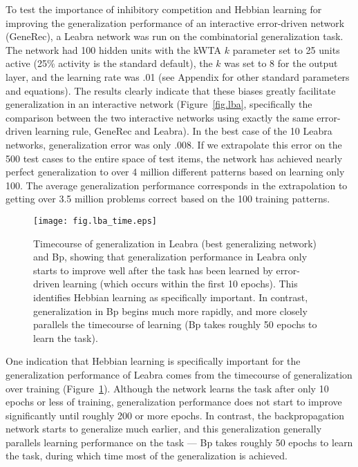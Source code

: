 \documentclass[12pt,twoside]{article}
\begin{document}
To test the importance of inhibitory competition and Hebbian learning
for improving the generalization performance of an interactive
error-driven network (GeneRec), a Leabra network was run on the
combinatorial generalization task.  The network had 100 hidden units
with the kWTA $k$ parameter set to 25 units active (25\% activity is
the standard default), the $k$ was set to 8 for the output layer, and
the learning rate was .01 (see Appendix for other standard parameters
and equations).  The results clearly indicate that these biases
greatly facilitate generalization in an interactive network
(Figure~\ref{fig.lba}, specifically the comparison between the two
interactive networks using exactly the same error-driven learning
rule, GeneRec and Leabra).  In the best case of the 10 Leabra
networks, generalization error was only .008.  If we extrapolate this
error on the 500 test cases to the entire space of test items, the
network has achieved nearly perfect generalization to over 4 million
different patterns based on learning only 100.  The average
generalization performance corresponds in the extrapolation to getting
over 3.5 million problems correct based on the 100 training patterns.

\begin{figure}
  \centering\texttt{[image: fig.lba\_time.eps]}
  \caption{\small Timecourse of generalization in Leabra (best
    generalizing network) and Bp, showing that generalization
    performance in Leabra only starts to improve well after the task
    has been learned by error-driven learning (which occurs within the
    first 10 epochs).  This identifies Hebbian learning as
    specifically important.  In contrast, generalization in Bp begins
    much more rapidly, and more closely parallels the timecourse of
    learning (Bp takes roughly 50 epochs to learn the task).}
  \label{fig.lba_time}
\end{figure}

One indication that Hebbian learning is specifically important for the
generalization performance of Leabra comes from the timecourse of
generalization over training (Figure~\ref{fig.lba_time}).  Although
the network learns the task after only 10 epochs or less of training,
generalization performance does not start to improve significantly
until roughly 200 or more epochs.  In contrast, the backpropagation
network starts to generalize much earlier, and this generalization
generally parallels learning performance on the task --- Bp takes
roughly 50 epochs to learn the task, during which time most of the
generalization is achieved.
\end{document}
